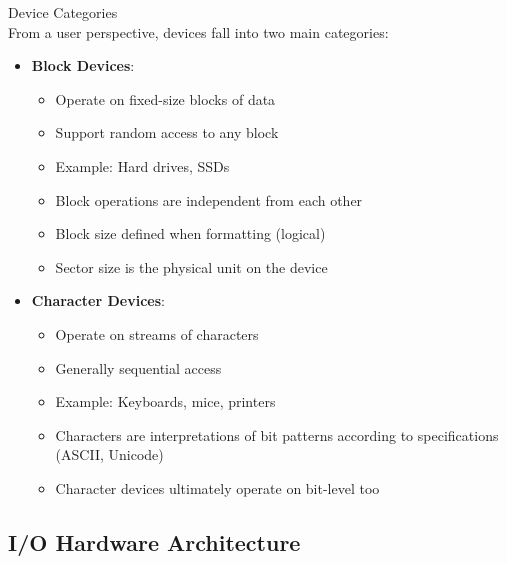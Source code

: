 \begin{definition}{Device Categories}\\
    From a user perspective, devices fall into two main categories:
    \begin{itemize}
        \item \textbf{Block Devices}:
            \begin{itemize}
                \item Operate on fixed-size blocks of data
                \item Support random access to any block
                \item Example: Hard drives, SSDs
                \item Block operations are independent from each other
                \item Block size defined when formatting (logical)
                \item Sector size is the physical unit on the device
            \end{itemize}
        \item \textbf{Character Devices}:
            \begin{itemize}
                \item Operate on streams of characters
                \item Generally sequential access
                \item Example: Keyboards, mice, printers
                \item Characters are interpretations of bit patterns according to specifications (ASCII, Unicode)
                \item Character devices ultimately operate on bit-level too
            \end{itemize}
    \end{itemize}
\end{definition}

\subsection{I/O Hardware Architecture}

